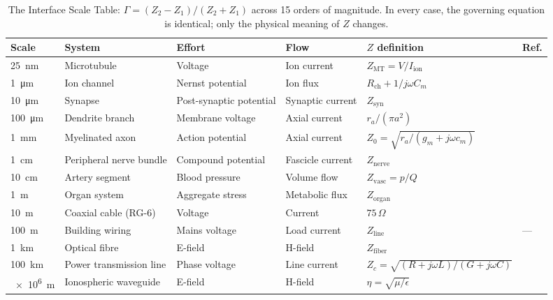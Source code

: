 \documentclass[aps,pre,twocolumn,superscriptaddress,floatfix]{revtex4-2}
\begin{document}
\begin{table}[t]
\centering
\caption{The Interface Scale Table: $\Gamma=(Z_2-Z_1)/(Z_2+Z_1)$
across 15 orders of magnitude.  In every case, the
governing equation is identical; only the physical meaning
of $Z$ changes.}
\label{tab:scale}
\begin{tabular}{llllll}
\toprule
Scale & System & Effort & Flow & $Z$ definition & Ref. \\
\midrule
\SI{25}{nm}  & Microtubule   & Voltage & Ion current
  & $Z_{\text{MT}}=V/I_{\text{ion}}$ & \cite{Kalra2025,Tuszynski2004} \\
\SI{1}{\micro m}  & Ion channel & Nernst potential & Ion flux
  & $R_{\text{ch}} + 1/j\omega C_m$ & \cite{HH1952} \\
\SI{10}{\micro m} & Synapse & Post-synaptic potential & Synaptic current
  & $Z_{\text{syn}}$ & \cite{Koch1999} \\
\SI{100}{\micro m} & Dendrite branch & Membrane voltage & Axial current
  & $r_a/(\pi a^2)$ & \cite{Rall1959} \\
\SI{1}{mm}   & Myelinated axon & Action potential & Axial current
  & $Z_0 = \sqrt{r_a/(g_m+j\omega c_m)}$ & \cite{PaperI} \\
\SI{1}{cm}   & Peripheral nerve bundle & Compound potential & Fascicle current
  & $Z_{\text{nerve}}$ & \cite{Geddes1967} \\
\SI{10}{cm}  & Artery segment & Blood pressure & Volume flow
  & $Z_{\text{vasc}} = p/Q$ & \cite{Nichols2022,Yao2019} \\
\SI{1}{m}    & Organ system & Aggregate stress & Metabolic flux
  & $Z_{\text{organ}}$ & \cite{PaperII} \\
\SI{10}{m}   & Coaxial cable (RG-6) & Voltage & Current
  & $75\,\Omega$ & \cite{Pozar2011} \\
\SI{100}{m}  & Building wiring & Mains voltage & Load current
  & $Z_{\text{line}}$ & --- \\
\SI{1}{km}   & Optical fibre & E-field & H-field
  & $Z_{\text{fiber}}$ & \cite{Saleh2019} \\
\SI{100}{km} & Power transmission line & Phase voltage & Line current
  & $Z_c = \sqrt{(R+j\omega L)/(G+j\omega C)}$ & \cite{Glover2022} \\
\SI{e6}{m}   & Ionospheric waveguide & E-field & H-field
  & $\eta = \sqrt{\mu/\epsilon}$ & \cite{Wait1962} \\
\bottomrule
\end{tabular}
\end{table}
\end{document}
